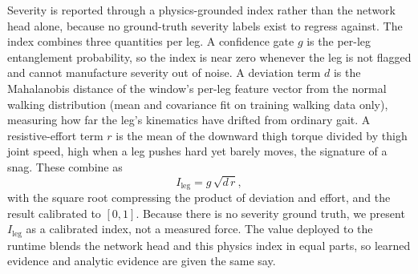 \documentclass[conference]{IEEEtran}
\begin{document}
Severity is reported through a physics-grounded index rather than the network head alone, because no ground-truth severity labels exist to regress against. The index combines three quantities per leg. A confidence gate $g$ is the per-leg entanglement probability, so the index is near zero whenever the leg is not flagged and cannot manufacture severity out of noise. A deviation term $d$ is the Mahalanobis distance of the window's per-leg feature vector from the normal walking distribution (mean and covariance fit on training walking data only), measuring how far the leg's kinematics have drifted from ordinary gait. A resistive-effort term $r$ is the mean of the downward thigh torque divided by thigh joint speed, high when a leg pushes hard yet barely moves, the signature of a snag. These combine as
\begin{equation}
I_{\text{leg}} = g\,\sqrt{d\,r},
\end{equation}
with the square root compressing the product of deviation and effort, and the result calibrated to $[0,1]$. Because there is no severity ground truth, we present $I_{\text{leg}}$ as a calibrated index, not a measured force. The value deployed to the runtime blends the network head and this physics index in equal parts, so learned evidence and analytic evidence are given the same say.
\end{document}
